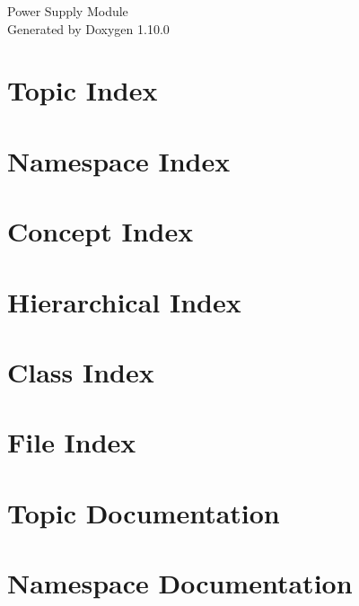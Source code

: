 \documentclass[twoside]{book}
\newcommand{\+}{\discretionary{\mbox{\scriptsize$\hookleftarrow$}}{}{}}
\newcommand{\clearemptydoublepage}{%
    \newpage{\pagestyle{empty}\cleardoublepage}%
  }
\begin{document}
  \raggedbottom
    \hypersetup{pageanchor=false,
                bookmarksnumbered=true,
                pdfencoding=unicode
               }
  \begin{titlepage}
  \vspace*{7cm}
  \begin{center}%
  {\Large Power Supply Module}\\
  \vspace*{1cm}
  {\large Generated by Doxygen 1.10.0}\\
  \end{center}
  \end{titlepage}
  \clearemptydoublepage
  \tableofcontents
  \clearemptydoublepage
  \hypersetup{pageanchor=true}
\chapter{Topic Index}

\chapter{Namespace Index}

\chapter{Concept Index}

\chapter{Hierarchical Index}

\chapter{Class Index}

\chapter{File Index}

\chapter{Topic Documentation}



\chapter{Namespace Documentation}

\end{document}
